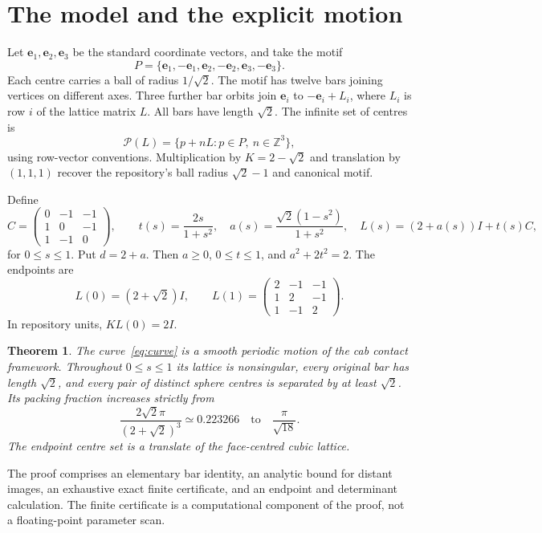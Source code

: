 \documentclass[11pt]{amsart}
\newtheorem{theorem}{Theorem}
\theoremstyle{remark}
\newcommand{\Z}{\mathbb Z}
\newcommand{\e}{\mathbf e}
\begin{document}
\section{The model and the explicit motion}

Let $\e_1,\e_2,\e_3$ be the standard coordinate vectors, and take the motif
\[
 P=\{\e_1,-\e_1,\e_2,-\e_2,\e_3,-\e_3\}.
\]
Each centre carries a ball of radius $1/\sqrt2$. The motif has twelve bars joining vertices on different axes. Three further bar orbits join $\e_i$ to $-\e_i+L_i$, where $L_i$ is row $i$ of the lattice matrix $L$. All bars have length $\sqrt2$. The infinite set of centres is
\[
 \mathcal P(L)=\{p+nL:p\in P,\ n\in\Z^3\},
\]
using row-vector conventions. Multiplication by $K=2-\sqrt2$ and translation by $(1,1,1)$ recover the repository's ball radius $\sqrt2-1$ and canonical motif.

Define
\begin{equation}\label{eq:curve}
 C=\begin{pmatrix}0&-1&-1\\1&0&-1\\1&-1&0\end{pmatrix},\qquad
 t(s)=\frac{2s}{1+s^2},\quad
 a(s)=\frac{\sqrt2(1-s^2)}{1+s^2},\quad
 L(s)=(2+a(s))I+t(s)C,
\end{equation}
for $0\le s\le1$. Put $d=2+a$. Then $a\ge0$, $0\le t\le1$, and $a^2+2t^2=2$. The endpoints are
\begin{equation}\label{eq:endpoints}
 L(0)=(2+\sqrt2)I,\qquad
 L(1)=\begin{pmatrix}2&-1&-1\\1&2&-1\\1&-1&2\end{pmatrix}.
\end{equation}
In repository units, $K L(0)=2I$.

\begin{theorem}\label{thm:main}
The curve~\eqref{eq:curve} is a smooth periodic motion of the cab contact framework. Throughout $0\le s\le1$ its lattice is nonsingular, every original bar has length $\sqrt2$, and every pair of distinct sphere centres is separated by at least $\sqrt2$. Its packing fraction increases strictly from
\[
 \frac{2\sqrt2\pi}{(2+\sqrt2)^3}\simeq0.223266
 \quad\text{to}\quad\frac{\pi}{\sqrt{18}}.
\]
The endpoint centre set is a translate of the face-centred cubic lattice.
\end{theorem}

The proof comprises an elementary bar identity, an analytic bound for distant images, an exhaustive exact finite certificate, and an endpoint and determinant calculation. The finite certificate is a computational component of the proof, not a floating-point parameter scan.
\end{document}
